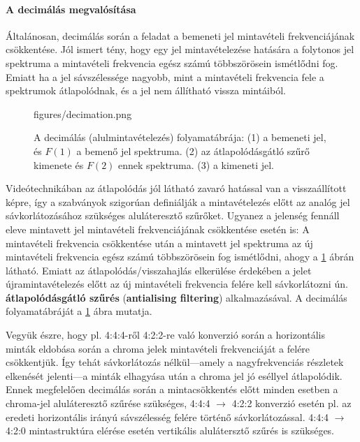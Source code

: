 \paragraph{A decimálás megvalósítása}
Általánosan, decimálás során a feladat a bemeneti jel mintavételi frekvenciájának csökkentése.
Jól ismert tény, hogy egy jel mintavételezése hatására a folytonos jel spektruma a mintavételi frekvencia egész számú többszörösein ismétlődni fog.
Emiatt ha a jel sávszélessége nagyobb, mint a mintavételi frekvencia fele a spektrumok átlapolódnak, és a jel nem állítható vissza mintáiból.
\begin{figure}[]
	\centering
	\begin{overpic}[width = 0.8\columnwidth ]{figures/decimation.png}
 	\end{overpic}
	\caption{A decimálás (alulmintavételezés) folyamatábrája: 
	(1) a bemeneti jel, és $F(1)$ a bemenő jel spektruma.
	(2) az átlapolódásgátló szűrő kimenete és $F(2)$ ennek spektruma.
	(3) a kimeneti jel.}
	\label{Fig:decimation}
\end{figure}
Videótechnikában az átlapolódás jól látható zavaró hatással van a visszaállított képre, így a szabványok szigorúan definiálják a mintavételezés előtt az analóg jel sávkorlátozásához szükséges aluláteresztő szűrőket.
Ugyanez a jelenség fennáll eleve mintavett jel mintavételi frekvenciájának csökkentése esetén is:
A mintavételi frekvencia csökkentése után a mintavett jel spektruma az új mintavételi frekvencia egész számú többszörösein fog ismétlődni, ahogy a \ref{Fig:decimation} ábrán látható.
Emiatt az átlapolódás/visszahajlás elkerülése érdekében a jelet újramintavételezés előtt az új mintavételi frekvencia felére kell sávkorlátozni ún. \textbf{átlapolódásgátló szűrés} (\textbf{antialising filtering}) alkalmazásával.
A decimálás folyamatábráját a \ref{Fig:decimation} ábra mutatja.

\vspace{3mm}
Vegyük észre, hogy pl. 4:4:4-ről 4:2:2-re való konverzió során a horizontális minták eldobása során a chroma jelek mintavételi frekvenciáját a felére csökkentjük.
Így tehát sávkorlátozás nélkül---amely a nagyfrekvenciás részletek elkenését jelenti---a minták elhagyása után a chroma jel jó eséllyel átlapolódik.
Ennek megfelelően decimálás során a mintacsökkentés előtt minden esetben a chroma-jel aluláteresztő szűrése szükséges, 4:4:4 $\rightarrow$ 4:2:2 konverzió esetén pl. az eredeti horizontális irányú sávszélesség felére történő sávkorlátozással.
4:4:4 $\rightarrow$ 4:2:0 mintastruktúra elérése esetén vertikális alulátersztő szűrés is szükséges.

